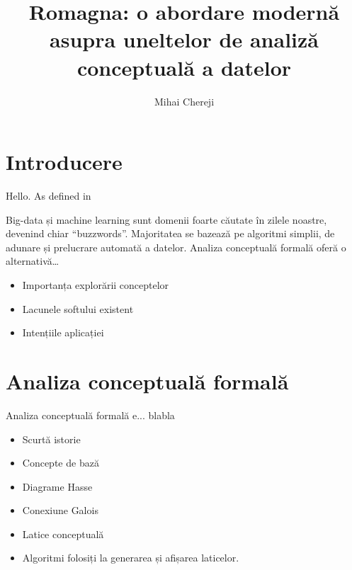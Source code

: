 \documentclass[12pt, a4paper, oneside, romanian]{teza-upb}
\begin{document}
\author{Mihai Chereji}

\title{Romagna: o abordare modernă asupra uneltelor de analiză conceptuală a datelor}




\beforepreface
\listoffigures
\listoftables
{}
\afterpreface 
\chapter{Introducere}
Hello\cite{punguta1876}.
As defined in \cite{wiki:xxx}


Big-data și machine learning sunt domenii foarte căutate în zilele noastre, devenind chiar “buzzwords”. Majoritatea se bazează pe algoritmi simplii, de adunare și prelucrare automată a datelor.
Analiza conceptuală formală oferă o alternativă…

\begin{itemize}
  \item Importanța explorării conceptelor
  \item Lacunele softului existent
  \item Intențiile aplicației
\end{itemize}

\chapter{Analiza conceptuală formală}
  Analiza conceptuală formală e... blabla
  \begin{itemize}
    \item Scurtă istorie
    \item Concepte de bază
    \item Diagrame Hasse
    \item Conexiune Galois
    \item Latice conceptuală
    \item Algoritmi folosiți la generarea și afișarea laticelor.
  \end{itemize}
\end{document}
